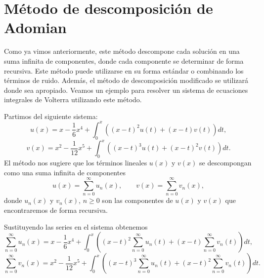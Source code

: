 \section{Método de descomposición de Adomian}
Como ya vimos anteriormente, este método descompone cada solución en una suma infinita de componentes, donde cada componente se determinar de forma recursiva. Este método puede utilizarse en su forma estándar o combinando los términos de ruido. Además, el método de descomposición modificado se utilizará donde sea apropiado. Veamos un ejemplo para resolver un sistema de ecuaciones integrales de Volterra utilizando este método.
\begin{ejemplo}
	Partimos del siguiente sistema:
	\begin{equation}
		u(x) = x - \dfrac{1}{6}x^4 + \int_{0}^{x}((x-t)^2u(t) + (x-t)v(t))dt,
	\end{equation}
	\begin{equation}
		v(x) = x^2 - \dfrac{1}{12}x^5 + \int_{0}^{x}((x-t)^3u(t) + (x-t)^2v(t))dt.
	\end{equation}
	El método nos sugiere que los términos lineales $u(x)$ y $v(x)$ se descompongan como una suma infinita de componentes
	\begin{equation}
		u(x) = \sum_{n=0}^{\infty}u_n(x), \qquad v(x) = \sum_{n=0}^{\infty}v_n(x),
	\end{equation}
	donde $u_n(x)$ y $v_n(x)$, $n \geqslant 0$ son las componentes de $u(x)$ y $v(x)$ que encontraremos de forma recursiva.
	
	Sustituyendo las series en el sistema obtenemos
	\begin{equation}
		\sum_{n=0}^{\infty}u_n(x) = x - \dfrac{1}{6}x^4 + \int_{0}^{x}((x-t)^2\sum_{n=0}^{\infty}u_n(t) + (x-t)\sum_{n=0}^{\infty}v_n(t))dt,
	\end{equation}
	\begin{equation}
		\sum_{n=0}^{\infty}v_n(x) = x^2 - \dfrac{1}{12}x^5 + \int_{0}^{x}((x-t)^3\sum_{n=0}^{\infty}u_n(t) + (x-t)^2\sum_{n=0}^{\infty}v_n(t))dt.
	\end{equation}
	

\end{ejemplo}
